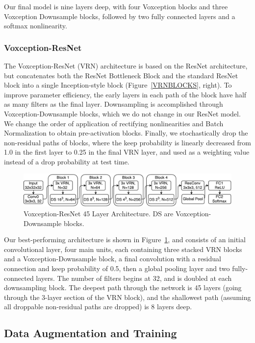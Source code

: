 \documentclass{article}
\begin{document}
Our final model is nine layers deep, with four Voxception blocks and three Voxception Downsample blocks, followed by two fully connected layers and a softmax nonlinearity. 

\subsubsection{Voxception-ResNet}
The Voxception-ResNet (VRN) architecture is based on the ResNet architecture\citep{ResNet}, but concatenates both the ResNet Bottleneck Block and the standard ResNet block into a single Inception\citep{Inception}-style block (Figure~\ref{VRNBLOCKS}, right). To improve parameter efficiency, the early layers in each path of the block have half as many filters as the final layer. Downsampling is accomplished through Voxception-Downsample blocks, which we do not change in our ResNet model. We change the order of application of rectifying nonlinearities and Batch Normalization to obtain pre-activation blocks\citep{PreActivation}. Finally, we stochastically drop the non-residual paths of blocks\citep{StochasticDepth}, where the keep probability is linearly decreased from 1.0 in the first layer to 0.25 in the final VRN layer, and used as a weighting value instead of a drop probability at test time.

\begin{figure}[ht]
  \centering
  \includegraphics[scale=.6]{VRN_full2.pdf}
  \caption{Voxception-ResNet 45 Layer Architecture. DS are Voxception-Downsample blocks.}
  \label{VRNFULL}
\end{figure}
Our best-performing architecture is shown in Figure~\ref{VRNFULL}, and consists of an initial convolutional layer, four main units, each containing three stacked VRN blocks and a Voxception-Downsample block, a final convolution with a residual connection and keep probability of 0.5, then a global pooling layer and two fully-connected layers. The number of filters begins at 32, and is doubled at each downsampling block. The deepest path through the network is 45 layers (going through the 3-layer section of the VRN block), and the shallowest path (assuming all droppable non-residual paths are dropped) is 8 layers deep.

\subsection{Data Augmentation and Training}
\end{document}
